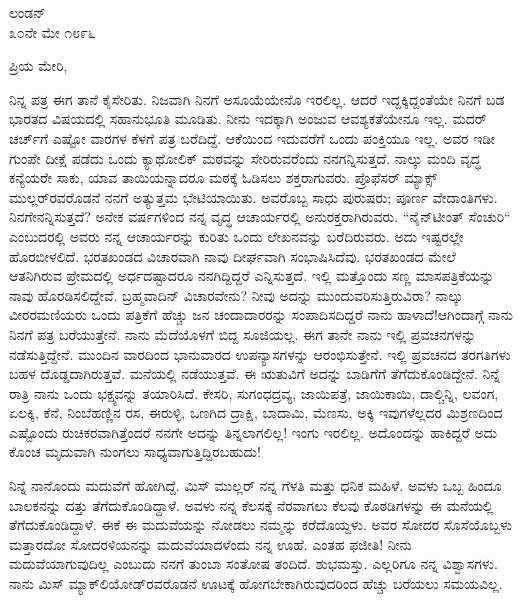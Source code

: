 \begin{flushright}
ಲಂಡನ್\\೩೦ನೇ ಮೇ ೧೮೯೬
\end{flushright}

\noindent
ಪ್ರಿಯ ಮೇರಿ,

ನಿನ್ನ ಪತ್ರ ಈಗ ತಾನೆ ಕೈಸೇರಿತು. ನಿಜವಾಗಿ ನಿನಗೆ ಅಸೂಯೆಯೇನೊ ಇರಲಿಲ್ಲ. ಆದರೆ ಇದ್ದಕ್ಕಿದ್ದಂತೆಯೇ ನಿನಗೆ ಬಡ ಭಾರತದ ವಿಷಯದಲ್ಲಿ ಸಹಾನುಭೂತಿ ಮೂಡಿತು. ನೀನು ಇದಕ್ಕಾಗಿ ಅಂಜುವ ಆವಶ್ಯಕತೆಯೇನೂ ಇಲ್ಲ. ಮದರ್‌ ಚರ್ಚ್‌ಗೆ ಎಷ್ಟೋ ವಾರಗಳ ಕೆಳಗೆ ಪತ್ರ ಬರೆದಿದ್ದೆ. ಆಕೆಯಿಂದ ಇದುವರೆಗೆ ಒಂದು ಪಂಕ್ತಿಯೂ ಇಲ್ಲ. ಅವರ ಇಡೀ ಗುಂಪೇ ದೀಕ್ಷೆ ಪಡೆದು ಒಂದು ಕ್ಯಾಥೋಲಿಕ್ ಮಠವನ್ನು ಸೇರಿರುವರೆಂದು ನನಗನ್ನಿಸುತ್ತದೆ. ನಾಲ್ಕು ಮಂದಿ ವೃದ್ಧ ಕನ್ಯೆಯರೇ ಸಾಕು, ಯಾವ ತಾಯಿಯನ್ನಾದರೂ ಮಠಕ್ಕೆ ಓಡಿಸಲು ಶಕ್ತರಾಗುವರು. ಪ್ರೊಫೆಸರ್‌ ಮ್ಯಾಕ್ಸ್ ಮುಲ್ಲರ್‌ರವರೊಡನೆ ನನಗೆ ಅತ್ಯುತ್ತಮ ಭೇಟಿಯಾಯಿತು. ಅವರೊಬ್ಬ ಸಾಧು ಪುರುಷರು; ಪೂರ್ಣ ವೇದಾಂತಿಗಳು. ನಿನಗೇನನ್ನಿಸುತ್ತದೆ? ಅನೇಕ ವರ್ಷಗಳಿಂದ ನನ್ನ ವೃದ್ಧ ಆಚಾರ್ಯರಲ್ಲಿ ಅನುರಕ್ತರಾಗಿರುವರು. “ನೈನ್‌ಟೀಂತ್ ಸೆಂಚುರಿ“ ಎಂಬುದರಲ್ಲಿ ಅವರು ನನ್ನ ಆಚಾರ್ಯರನ್ನು ಕುರಿತು ಒಂದು ಲೇಖನವನ್ನು ಬರೆದಿರುವರು. ಅದು ಇಷ್ಟರಲ್ಲೇ ಹೊರಬೀಳಲಿದೆ. ಭರತಖಂಡದ ವಿಚಾರವಾಗಿ ನಾವು ದೀರ್ಘವಾಗಿ ಸಂಭಾಷಿಸಿದೆವು. ಭರತಖಂಡದ ಮೇಲೆ ಆತನಿಗಿರುವ ಪ್ರೇಮದಲ್ಲಿ ಅರ್ಧದಷ್ಟಾದರೂ ನನಗಿದ್ದಿದ್ದರೆ ಎನ್ನಿಸುತ್ತದೆ. ಇಲ್ಲಿ ಮತ್ತೊಂದು ಸಣ್ಣ ಮಾಸಪತ್ರಿಕೆಯನ್ನು ನಾವು ಹೊರಡಿಸಲಿದ್ದೇವೆ. ಬ್ರಹ್ಮವಾದಿನ್ ವಿಚಾರವೇನು? ನೀವು ಅದನ್ನು ಮುಂದುವರಿಸುತ್ತಿರುವಿರಾ? ನಾಲ್ಕು ವೀರರಮಣಿಯರು ಒಂದು ಪತ್ರಿಕೆಗೆ ಹೆಚ್ಚು ಜನ ಚಂದಾದಾರರನ್ನು ಸಂಪಾದಿಸದಿದ್ದರೆ ನಾನು ಹಾಳಾದೆ!ಆಗಿಂದಾಗ್ಗೆ ನಾನು ನಿನಗೆ ಪತ್ರ ಬರೆಯುತ್ತೇನೆ. ನಾನು ಮೆದೆಯೊಳಗೆ ಬಿದ್ದ ಸೂಜಿಯಲ್ಲ. ಈಗ ತಾನೇ ನಾನು ಇಲ್ಲಿ ಪ್ರವಚನಗಳನ್ನು ನಡೆಸುತ್ತಿದ್ದೇನೆ. ಮುಂದಿನ ವಾರದಿಂದ ಭಾನುವಾರದ ಉಪನ್ಯಾಸಗಳನ್ನು ಆರಂಭಿಸುತ್ತೇನೆ. ಇಲ್ಲಿ ಪ್ರವಚನದ ತರಗತಿಗಳು ಬಹಳ ದೊಡ್ಡದಾಗಿರುತ್ತವೆ. ಮನೆಯಲ್ಲಿ ನಡೆಯುತ್ತವೆ. ಈ ಋತುವಿಗೆ ಅದನ್ನು ಬಾಡಿಗೆಗೆ ತೆಗೆದುಕೊಂಡಿದ್ದೇನೆ. ನಿನ್ನೆ ರಾತ್ರಿ ನಾನು ಒಂದು ಭಕ್ಷ್ಯವನ್ನು ತಯಾರಿಸಿದೆ. ಕೇಸರಿ, ಸುಗಂಧದ್ರವ್ಯ, ಜಾಯಿಪತ್ರೆ, ಜಾಯಿಕಾಯಿ, ದಾಲ್ಚಿನ್ನಿ, ಲವಂಗ, ಏಲಕ್ಕಿ, ಕೆನೆ, ನಿಂಬೆಹಣ್ಣಿನ ರಸ, ಈರುಳ್ಳಿ, ಒಣಗಿದ ದ್ರಾಕ್ಷಿ, ಬಾದಾಮಿ, ಮೆಣಸು, ಅಕ್ಕಿ ಇವುಗಳೆಲ್ಲದರ ಮಿಶ್ರಣದಿಂದ ಎಷ್ಟೊಂದು ರುಚಿಕರವಾಗಿತ್ತೆಂದರೆ ನನಗೇ ಅದನ್ನು ತಿನ್ನಲಾಗಲಿಲ್ಲ! ಇಂಗು ಇರಲಿಲ್ಲ. ಅದೊಂದನ್ನು ಹಾಕಿದ್ದರೆ ಅದು ಕೊಂಚ ಮೃದುವಾಗಿ ನುಂಗಲು ಸಾಧ್ಯವಾಗುತ್ತಿದ್ದಿರಬಹುದು!
\vspace{0.3cm}

ನಿನ್ನೆ ನಾನೊಂದು ಮದುವೆಗೆ ಹೋಗಿದ್ದೆ. ಮಿಸ್ ಮುಲ್ಲರ್ ನನ್ನ ಗೆಳತಿ ಮತ್ತು ಧನಿಕ ಮಹಿಳೆ. ಅವಳು ಒಬ್ಬ ಹಿಂದೂ ಬಾಲಕನನ್ನು ದತ್ತು ತೆಗೆದುಕೊಂಡಿದ್ದಾಳೆ. ಅವಳು ನನ್ನ ಕೆಲಸಕ್ಕೆ ನೆರವಾಗಲು ಕೆಲವು ಕೊಠಡಿಗಳನ್ನು ಈ ಮನೆಯಲ್ಲಿ ತೆಗೆದುಕೊಂಡಿದ್ದಾಳೆ. ಈಕೆ ಈ ಮದುವೆಯನ್ನು ನೋಡಲು ನಮ್ಮನ್ನು ಕರೆದೊಯ್ದಳು. ಅವರ ಸೋದರ ಸೊಸೆಯೊಬ್ಬಳು ಮತ್ತಾರದೋ ಸೋದರಳಿಯನನ್ನು ಮದುವೆಯಾದಳೆಂದು ನನ್ನ ಊಹೆ. ಎಂತಹ ಫಜೀತಿ! ನೀನು ಮದುವೆಯಾಗುವುದಿಲ್ಲ ಎಂಬುದು ನನಗೆ ತುಂಬಾ ಸಂತೋಷ ತಂದಿದೆ. ಶುಭಮಸ್ತು. ಎಲ್ಲರಿಗೂ ನನ್ನ ವಿಶ್ವಾಸಗಳು. ನಾನು ಮಿಸ್ ಮ್ಯಾಕ್‌ಲಿಯೋಡ್‌ರವರೊಡನೆ ಊಟಕ್ಕೆ ಹೋಗಬೇಕಾಗಿರುವುದರಿಂದ ಹೆಚ್ಚು ಬರೆಯಲು ಸಮಯವಿಲ್ಲ.
\vspace{0.3cm}

